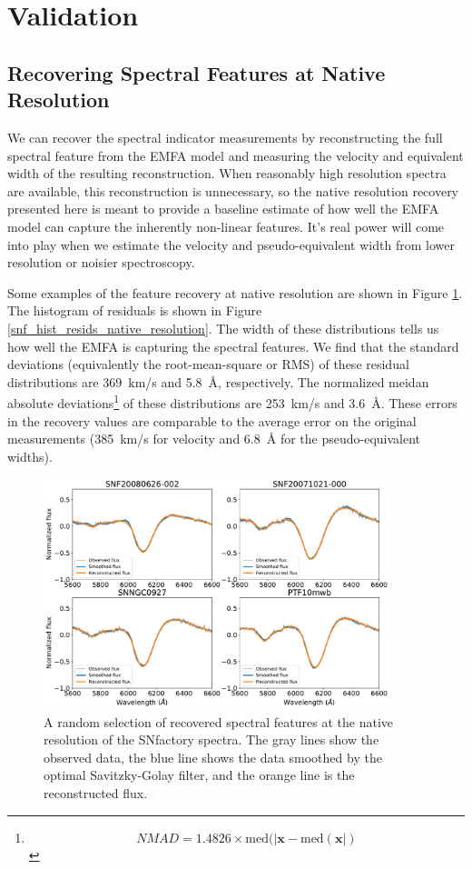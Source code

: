 \section{Validation}
\label{validation}

\subsection{Recovering Spectral Features at Native Resolution}
\label{snf_validation}
We can recover the spectral indicator measurements by reconstructing the full spectral feature from the EMFA model and measuring the velocity and equivalent width of the resulting reconstruction. When reasonably high resolution spectra are available, this reconstruction is unnecessary, so the native resolution recovery presented here is meant to provide a baseline estimate of how well the EMFA model can capture the inherently non-linear \siliconii{} features. It's real power will come into play when we estimate the velocity and pseudo-equivalent width from lower resolution or noisier spectroscopy.

Some examples of the feature recovery at native resolution are shown in Figure \ref{feature_recovery}. The histogram of residuals is shown in Figure \ref{snf_hist_resids_native_resolution}. The width of these distributions tells us how well the EMFA is capturing the spectral features. We find that the standard deviations (equivalently the root-mean-square or RMS) of these residual distributions are 369~km/s and 5.8~\AA{}, respectively. The normalized meidan absolute deviations\footnote{$$NMAD=1.4826\times\textrm{med}(|\bm{x}-\textrm{med}(\bm{x}|)$$} of these distributions are 253~km/s and 3.6~\AA{}. These errors in the recovery values are comparable to the average error on the original measurements (385~km/s for velocity and 6.8~\AA{} for the pseudo-equivalent widths).

\begin{figure}[htbp]
    \centering
    \includegraphics[width=0.9\textwidth]{figures/si_feat_pca/example_reconstruction.pdf}
    \caption{A random selection of recovered spectral features at the native resolution of the SNfactory spectra. The gray lines show the observed data, the blue line shows the data smoothed by the optimal Savitzky-Golay filter, and the orange line is the reconstructed flux.}
    \label{feature_recovery}
\end{figure}

